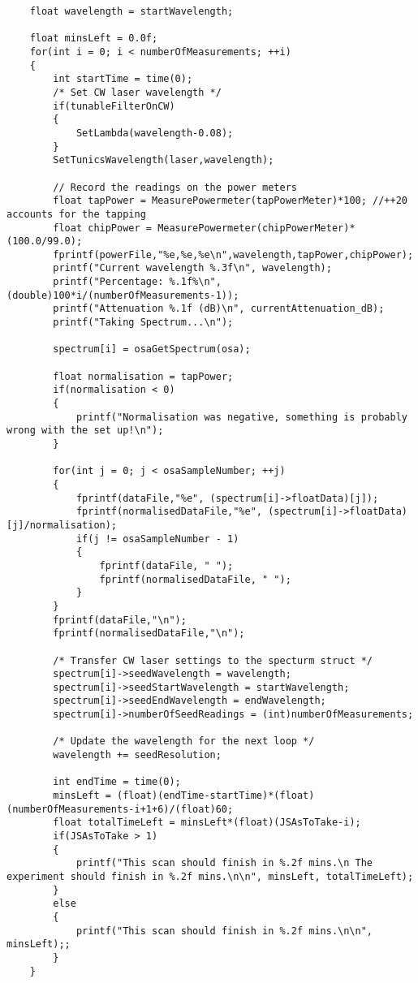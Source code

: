 \begin{lstlisting}
    float wavelength = startWavelength;

    float minsLeft = 0.0f;
    for(int i = 0; i < numberOfMeasurements; ++i)
    {
        int startTime = time(0);
        /* Set CW laser wavelength */
        if(tunableFilterOnCW)
        {
            SetLambda(wavelength-0.08);
        }
        SetTunicsWavelength(laser,wavelength);

        // Record the readings on the power meters
        float tapPower = MeasurePowermeter(tapPowerMeter)*100; //++20 accounts for the tapping
        float chipPower = MeasurePowermeter(chipPowerMeter)*(100.0/99.0);
        fprintf(powerFile,"%e,%e,%e\n",wavelength,tapPower,chipPower);
        printf("Current wavelength %.3f\n", wavelength);
        printf("Percentage: %.1f%\n", (double)100*i/(numberOfMeasurements-1));
        printf("Attenuation %.1f (dB)\n", currentAttenuation_dB);
        printf("Taking Spectrum...\n");

        spectrum[i] = osaGetSpectrum(osa);

        float normalisation = tapPower;
        if(normalisation < 0)
        {
            printf("Normalisation was negative, something is probably wrong with the set up!\n");
        }

        for(int j = 0; j < osaSampleNumber; ++j)
        {
            fprintf(dataFile,"%e", (spectrum[i]->floatData)[j]);
            fprintf(normalisedDataFile,"%e", (spectrum[i]->floatData)[j]/normalisation);
            if(j != osaSampleNumber - 1)
            {
                fprintf(dataFile, " ");
                fprintf(normalisedDataFile, " ");
            }
        }
        fprintf(dataFile,"\n");
        fprintf(normalisedDataFile,"\n");

        /* Transfer CW laser settings to the specturm struct */
        spectrum[i]->seedWavelength = wavelength;
        spectrum[i]->seedStartWavelength = startWavelength;
        spectrum[i]->seedEndWavelength = endWavelength;
        spectrum[i]->numberOfSeedReadings = (int)numberOfMeasurements;

        /* Update the wavelength for the next loop */
        wavelength += seedResolution;

        int endTime = time(0);
        minsLeft = (float)(endTime-startTime)*(float)(numberOfMeasurements-i+1+6)/(float)60;
        float totalTimeLeft = minsLeft*(float)(JSAsToTake-i);
        if(JSAsToTake > 1)
        {
            printf("This scan should finish in %.2f mins.\n The experiment should finish in %.2f mins.\n\n", minsLeft, totalTimeLeft);
        }
        else
        {
            printf("This scan should finish in %.2f mins.\n\n", minsLeft);;
        }
    }


\end{lstlisting}

